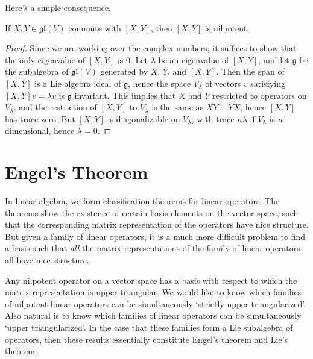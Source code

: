 Here's a simple consequence.

\begin{theorem}
    If $X, Y \in \mathfrak{gl}(V)$ commute with $[X,Y]$, then $[X,Y]$ is nilpotent.
\end{theorem}
\begin{proof}
    Since we are working over the complex numbers, it suffices to show that the only eigenvalue of $[X,Y]$ is 0. Let $\lambda$ be an eigenvalue of $[X,Y]$, and let $\mathfrak{g}$ be the subalgebra of $\mathfrak{gl}(V)$ generated by $X$, $Y$, and $[X,Y]$. Then the span of $[X,Y]$ is a Lie algebra ideal of $\mathfrak{g}$, hence the space $V_\lambda$ of vectors $v$ satisfying $[X,Y]v = \lambda v$ is $\mathfrak{g}$ invariant. This implies that $X$ and $Y$ restricted to operators on $V_\lambda$, and the restriction of $[X,Y]$ to $V_\lambda$ is the same as $XY - YX$, hence $[X,Y]$ has trace zero. But $[X,Y]$ is diagonalizable on $V_\lambda$, with trace $n \lambda$ if $V_\lambda$ is $n$-dimensional, hence $\lambda = 0$.
\end{proof}

\section{Engel's Theorem}

In linear algebra, we form classification theorems for linear operators. The theorems show the existence of certain basis elements on the vector space, such that the corresponding matrix representation of the operators have nice structure. But given a family of linear operators, it is a much more difficult problem to find a basis such that {\it all} the matrix representations of the family of linear operators all have nice structure.

Any nilpotent operator on a vector space has a basis with respect to which the matrix representation is upper triangular. We would like to know which families of nilpotent linear operators can be simultaneously `strictly upper triangularized'. Also natural is to know which families of linear operators can be simultaneously `upper triangularized'. In the case that these families form a Lie subalgebra of operators, then these results essentially constitute Engel's theorem and Lie's theorem.

